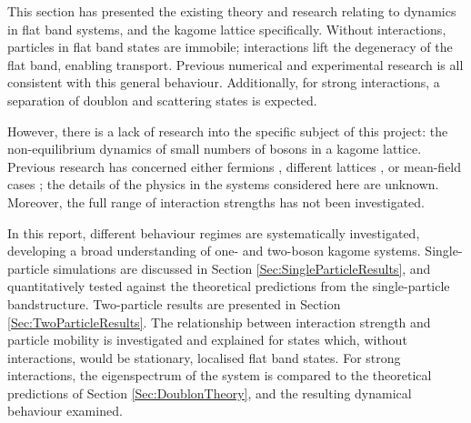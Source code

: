 This section has presented the existing theory and research relating to dynamics in flat band systems, and the kagome lattice specifically. Without interactions, particles in flat band states are immobile; interactions lift the degeneracy of the flat band, enabling transport. Previous numerical and experimental research is all consistent with this general behaviour. Additionally, for strong interactions, a separation of doublon and scattering states is expected.

However, there is a lack of research into the specific subject of this project: the non-equilibrium dynamics of small numbers of bosons in a kagome lattice. Previous research has concerned either fermions \cite{Chien14-1}, different lattices \cite{Torma,Apaja,Hyrkas,Ozawa}, or mean-field cases \cite{Ozawa,Leung}; the details of the physics in the systems considered here are unknown. Moreover, the full range of interaction strengths has not been investigated.

In this report, different behaviour regimes are systematically investigated, developing a broad understanding of one- and two-boson kagome systems. Single-particle simulations are discussed in Section \ref{Sec:SingleParticleResults}, and quantitatively tested against the theoretical predictions from the single-particle bandstructure. Two-particle results are presented in Section \ref{Sec:TwoParticleResults}. The relationship between interaction strength and particle mobility is investigated and explained for states which, without interactions, would be stationary, localised flat band states. For strong interactions, the eigenspectrum of the system is compared to the theoretical predictions of Section \ref{Sec:DoublonTheory}, and the resulting dynamical behaviour examined.